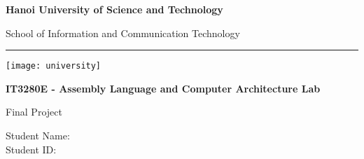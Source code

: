 \documentclass{article}
\begin{document}
\begin{titlepage}
    \begin{center}
        \vspace*{1cm}
            
        \LARGE
        \textbf{Hanoi University of Science and Technology}
            
        \vspace{0.1cm}
        \Large
        School of Information and Communication Technology
        \rule{\linewidth}{0.4pt}
    
        \vspace{4cm}
            
        \texttt{[image: university]}
        
        \vspace{3cm}

        \large
        \textbf{IT3280E - Assembly Language and Computer Architecture Lab}

        \vspace{0.1cm}
        Final Project 
        \vspace{0.5cm}
        
        Student Name: \\
        Student ID: \\
            
    \end{center}
\end{titlepage}
\end{document}
